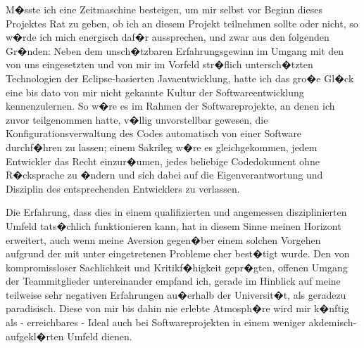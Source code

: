 M�sste ich eine Zeitmaschine besteigen, um mir selbst vor Beginn dieses Projektes Rat zu geben, ob ich an diesem
Projekt teilnehmen sollte oder nicht, so w�rde ich mich energisch daf�r aussprechen, und zwar aus den folgenden
Gr�nden: Neben dem unsch�tzbaren Erfahrungsgewinn im Umgang mit den von uns eingesetzten und von mir im Vorfeld 
str�flich untersch�tzten Technologien der Eclipse-basierten Javaentwicklung, hatte ich das gro�e Gl�ck eine bis
dato von mir nicht gekannte Kultur der Softwareentwicklung kennenzulernen. So w�re es im Rahmen der Softwareprojekte, 
an denen ich zuvor teilgenommen hatte, v�llig unvorstellbar gewesen, die Konfigurationsverwaltung des Codes automatisch
von einer Software durchf�hren zu lassen; einem Sakrileg w�re es gleichgekommen, jedem Entwickler das Recht
einzur�umen, jedes beliebige Codedokument ohne R�cksprache zu �ndern und sich dabei auf die Eigenverantwortung und 
Disziplin des entsprechenden Entwicklers zu verlassen.\par

Die Erfahrung, dass dies in einem qualifizierten und angemessen disziplinierten Umfeld tats�chlich funktionieren kann, 
hat in diesem Sinne meinen Horizont erweitert, auch wenn meine Aversion gegen�ber einem solchen Vorgehen aufgrund der mit 
unter eingetretenen Probleme eher best�tigt wurde. Den von kompromissloser Sachlichkeit und Kritikf�higkeit gepr�gten, 
offenen Umgang der Teammitglieder untereinander empfand ich, gerade im Hinblick auf meine teilweise sehr negativen Erfahrungen 
au�erhalb der Universit�t, als geradezu paradisisch. Diese von mir bis dahin nie erlebte Atmosph�re wird mir k�nftig als 
- erreichbares - Ideal auch bei Softwareprojekten in einem weniger akdemisch-aufgekl�rten Umfeld dienen.

